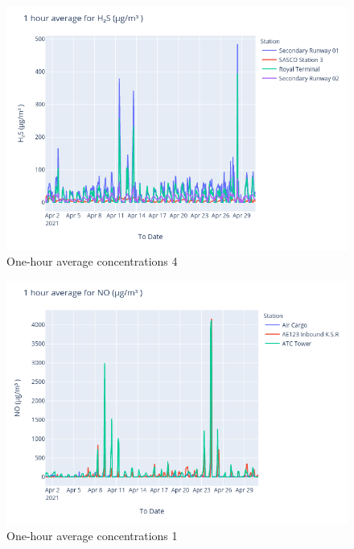 \documentclass[12pt, oneside]{book}
\begin{document}
{
{\begin{figure}[H]
\centering
\includegraphics[width=\textwidth]{image225}
\caption{One-hour average  concentrations 4}\label{image225}
\end{figure}}{}



{\begin{figure}[H]
\centering
\includegraphics[width=\textwidth]{image190}
\caption{One-hour average  concentrations 1}\label{image190}
\end{figure}}{}


}
\end{document}
